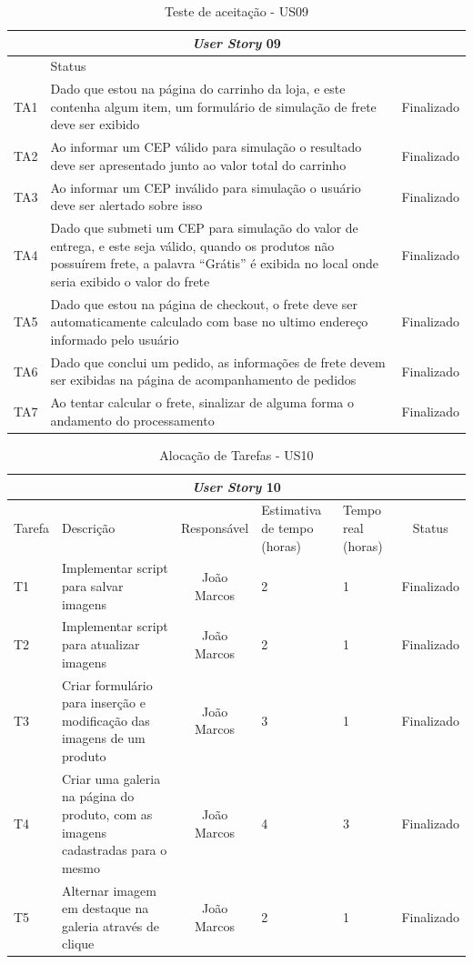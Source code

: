 \documentclass[a4paper,12pt]{monografia}
\begin{document}
\begin{longtable}{|l|p{11.8cm}|c|}
\caption{Teste de aceitação - US09}
\label{quadro:teste-aceitacao-us09}
\hline
\multicolumn{3}{|c|}{\textbf{\textit{User Story} 09}}\\
\hline		
\rowcolor{ballblue}
\multicolumn{2}{|c|}{Testes de aceitação} & Status\\	
\hline
TA1 & Dado que estou na página do carrinho da loja, e este contenha algum item, um formulário de simulação de frete deve ser exibido & Finalizado\\
\hline
TA2 & Ao informar um CEP válido para simulação o resultado deve ser apresentado junto ao valor total do carrinho  & Finalizado\\
\hline
TA3 & Ao informar um CEP inválido para simulação o usuário deve ser alertado sobre isso  & Finalizado\\
\hline
TA4 & Dado que submeti um CEP para simulação do valor de entrega, e este seja válido, quando os produtos não possuírem frete, a palavra ``Grátis'' é exibida no local onde seria exibido o valor do frete  & Finalizado\\
\hline
TA5 & Dado que estou na página de checkout, o frete deve ser automaticamente calculado com base no ultimo endereço informado pelo usuário  & Finalizado\\
\hline
TA6 & Dado que conclui um pedido, as informações de frete devem ser exibidas na página de acompanhamento de pedidos  & Finalizado\\
\hline
TA7 & Ao tentar calcular o frete, sinalizar de alguma forma o andamento do processamento & Finalizado\\
\hline
\end{longtable}

\begin{longtable}{|p{1.5cm}|p{3.5cm}|c|p{2cm}|p{2cm}|c|}
\caption{Alocação de Tarefas - US10}
\label{quadro:tat-us10}
\hline
\multicolumn{6}{|c|}{\textbf{\textit{User Story} 10}}\\
\hline		
\rowcolor{ballblue}
Tarefa & Descrição & Responsável & Estimativa de tempo (horas) & Tempo real (horas) & Status\\
\hline
T1 & Implementar script para salvar imagens & João Marcos & 2 & 1 & Finalizado\\
\hline
T2 & Implementar script para atualizar imagens & João Marcos & 2 & 1 & Finalizado\\
\hline
T3 & Criar formulário para inserção e modificação das imagens de um produto & João Marcos & 3 & 1 & Finalizado\\
\hline
T4 & Criar uma galeria na página do produto, com as imagens cadastradas para o mesmo & João Marcos & 4 & 3 & Finalizado\\
\hline
T5 & Alternar imagem em destaque na galeria através de clique & João Marcos & 2 & 1 & Finalizado\\
\hline
\end{longtable}
\end{document}
